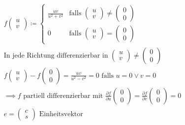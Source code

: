 \begin{bsp*}
	\begin{gather*}
		f\begin{pmatrix} u \\ v \end{pmatrix} \coloneqq \begin{cases}
			\frac{uv}{u^2 + v^2}	&\text{falls } \begin{pmatrix} u \\ v \end{pmatrix} \neq \begin{pmatrix} 0 \\ 0 \end{pmatrix}	\\
			0				&\text{falls } \begin{pmatrix} u \\ v \end{pmatrix} = \begin{pmatrix} 0 \\ 0 \end{pmatrix}		
		\end{cases} \\
		\text{In jede Richtung differenzierbar in } \begin{pmatrix} u \\ v \end{pmatrix} \neq \begin{pmatrix} 0 \\ 0 \end{pmatrix} \\
		f\begin{pmatrix} u \\ v \end{pmatrix} - f\begin{pmatrix} 0 \\ 0 \end{pmatrix} = \frac{uv}{u^2 - v^2} = 0 \text{ falls } u = 0 \vee v = 0 \\
		\implies f \text{ partiell differenzierbar mit } \frac{\partial f}{\partial u}\begin{pmatrix} 0 \\ 0 \end{pmatrix} = \frac{\partial f}{\partial v}\begin{pmatrix} 0 \\ 0 \end{pmatrix} = 0 \\
		e = \begin{pmatrix} c \\ s \end{pmatrix} \text{ Einheitsvektor} \\

\end{gather*}
\end{bsp*}

